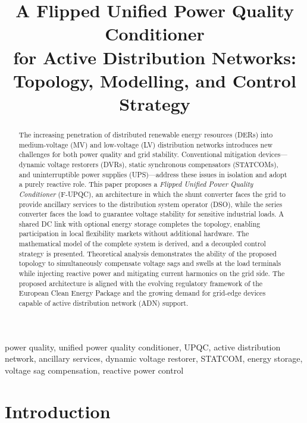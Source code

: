 \documentclass[conference]{IEEEtran}
\title{%
  A Flipped Unified Power Quality Conditioner\\
  for Active Distribution Networks:\\
  Topology, Modelling, and Control Strategy%
}
\author{%
  \IEEEauthorblockN{Davide Bagnara}
  \IEEEauthorblockA{%
    Independent Researcher\\
    Sterzing (BZ), Italy\\
    \href{mailto:davide.bagnara@pwr-control.com}{davide.bagnara@pwr-control.com}%
  }
}
\begin{document}
\maketitle


\begin{abstract}
The increasing penetration of distributed renewable energy resources
(DERs) into medium-voltage (MV) and low-voltage (LV) distribution
networks introduces new challenges for both power quality and grid
stability. Conventional mitigation devices---dynamic voltage restorers
(DVRs), static synchronous compensators (STATCOMs), and
uninterruptible power supplies (UPS)---address these issues in
isolation and adopt a purely reactive role.
This paper proposes a \emph{Flipped Unified Power Quality Conditioner}
(F-UPQC), an architecture in which the shunt converter faces the grid
to provide ancillary services to the distribution system operator
(DSO), while the series converter faces the load to guarantee voltage
stability for sensitive industrial loads.
A shared DC link with optional energy storage completes the topology,
enabling participation in local flexibility markets without additional
hardware.
The mathematical model of the complete system is derived, and a
decoupled control strategy is presented. Theoretical analysis
demonstrates the ability of the proposed topology to simultaneously
compensate voltage sags and swells at the load terminals while
injecting reactive power and mitigating current harmonics on the grid
side. The proposed architecture is aligned with the evolving regulatory
framework of the European Clean Energy Package and the growing demand
for grid-edge devices capable of active distribution network (ADN)
support.
\end{abstract}

\begin{IEEEkeywords}
power quality, unified power quality conditioner, UPQC, active
distribution network, ancillary services, dynamic voltage restorer,
STATCOM, energy storage, voltage sag compensation, reactive power
control
\end{IEEEkeywords}


\section{Introduction}
\label{sec:introduction}
\end{document}
